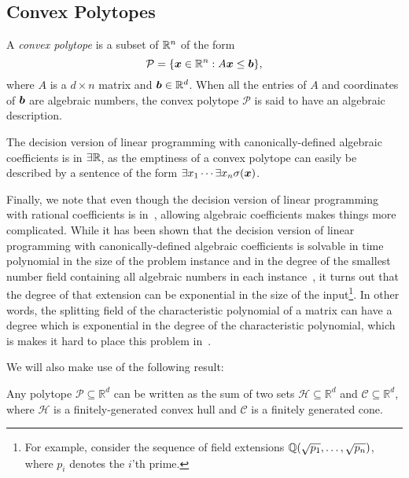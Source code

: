 \subsection{Convex Polytopes}

A \emph{convex polytope} is a subset of $\mathbb{R}^{n}$ of the form
\begin{equation*}
\mathcal{P} = \lbrace \boldsymbol{x} \in \mathbb{R}^{n} : A \boldsymbol{x} \leq \boldsymbol{b} \rbrace ,
\end{equation*}
where $A$ is a $d \times n$ matrix and $\boldsymbol{b} \in \mathbb{R}^{d}$. When all the entries of $A$ and coordinates of $\boldsymbol{b}$ are algebraic numbers, the convex polytope $\mathcal{P}$ is said to have an algebraic description.

The decision version of linear programming with canonically-defined algebraic coefficients is in $\exists\mathbb{R}$, as the emptiness of a convex polytope can easily be described by a sentence of the form $\exists x_1 \cdots \exists x_n \sigma(\boldsymbol{x})$.

Finally, we note that even though the decision version of linear
programming with rational coefficients is in~\PTIME{}, allowing
algebraic coefficients makes things more complicated. While it has
been shown that the decision version of linear programming
with canonically-defined algebraic coefficients is solvable in time polynomial
in the size of the problem instance and in the degree of the smallest
number field containing all algebraic numbers in each instance~\cite{AdlerB94}, it
turns out that the degree of that extension can
be exponential in the size of the input\footnote{For example, consider the sequence of field extensions $\mathbb{Q}(\sqrt{p_{1}}, \ldots, \sqrt{p_{n}})$, where $p_{i}$ denotes the $i$'th prime.}. In other words, the splitting
field of the characteristic polynomial of a matrix can have a degree
which is exponential in the degree of the characteristic polynomial, which is makes it hard to place this problem in~\PTIME{}.

We will also make use of the following result:
\begin{theorem}
  Any polytope $\mathcal{P} \subseteq \mathbb{R}^{d}$ can be written as the sum of two sets $\mathcal{H} \subseteq \mathbb{R}^{d}$ and $\mathcal{C} \subseteq \mathbb{R}^{d}$, where $\mathcal{H}$ is a finitely-generated convex hull and $\mathcal{C}$ is a finitely generated cone.
\end{theorem}
